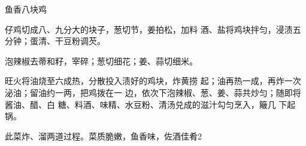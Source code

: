 \begin{recipe}{鱼香八块鸡}

\ingredients


\cooking

\step 	仔鸡切成八、九分大的块子，葱切节，姜拍松，加料 酒、盐将鸡块拌匀，浸渍五分钟；蛋清、干豆粉调芡。

\step 	泡辣椒去蒂和籽，宰碎；葱切细花；姜、蒜切细米。

\step 旺火将油烧至六成热，分散投入渍好的鸡块，炸黄捞 起；油再热一成，再炸一次泌油；留油约一两，把鸡拨在一 边，依次下泡辣椒、葱、姜、蒜共炒匀；随即将酱油、醋、白 糖、料酒、味精、水豆粉、清汤兑成的滋汁勾匀烹入，簸几 下起锅。

\notes

此菜炸、溜两道过程。菜质脆嫩，鱼香味，佐酒佳肴2

\end{recipe}

